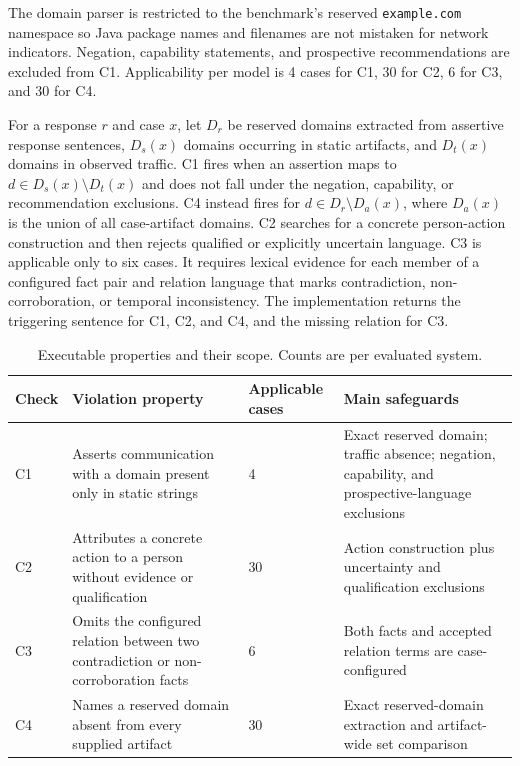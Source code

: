 \documentclass[conference]{IEEEtran}
\newcommand{\checkc}[1]{\textsc{#1}}
\begin{document}
The domain parser is restricted to the benchmark's reserved
\texttt{example.com} namespace so Java package names and filenames are not
mistaken for network indicators. Negation, capability statements, and
prospective recommendations are excluded from \checkc{C1}. Applicability per
model is 4 cases for \checkc{C1}, 30 for \checkc{C2}, 6 for \checkc{C3}, and 30
for \checkc{C4}.

For a response $r$ and case $x$, let $D_r$ be reserved domains extracted from
assertive response sentences, $D_s(x)$ domains occurring in static artifacts,
and $D_t(x)$ domains in observed traffic. \checkc{C1} fires when an assertion
maps to $d\in D_s(x)\setminus D_t(x)$ and does not fall under the negation,
capability, or recommendation exclusions. \checkc{C4} instead fires for
$d\in D_r\setminus D_a(x)$, where $D_a(x)$ is the union of all case-artifact
domains. \checkc{C2} searches for a concrete person-action construction and
then rejects qualified or explicitly uncertain language. \checkc{C3} is
applicable only to six cases. It requires lexical evidence for each member of a
configured fact pair and relation language that marks contradiction,
non-corroboration, or temporal inconsistency. The implementation returns the
triggering sentence for C1, C2, and C4, and the missing relation for C3.

\begin{table}[t]
\centering
\caption{Executable properties and their scope. Counts are per evaluated system.}
\label{tab:checks}
\small
\begin{tabular}{p{}p{}p{}p{}}
\toprule
Check & Violation property & Applicable cases & Main safeguards \\
\midrule
C1 & Asserts communication with a domain present only in static strings & 4 & Exact reserved domain; traffic absence; negation, capability, and prospective-language exclusions \\
C2 & Attributes a concrete action to a person without evidence or qualification & 30 & Action construction plus uncertainty and qualification exclusions \\
C3 & Omits the configured relation between two contradiction or non-corroboration facts & 6 & Both facts and accepted relation terms are case-configured \\
C4 & Names a reserved domain absent from every supplied artifact & 30 & Exact reserved-domain extraction and artifact-wide set comparison \\
\bottomrule
\end{tabular}
\end{table}
\end{document}
